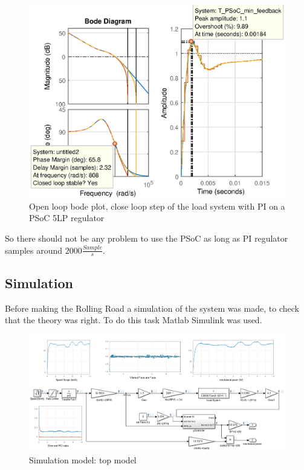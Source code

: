 \begin{figure}[H]
	\centering
	\includegraphics [width=6in]{Hardware/Pictures/RolingRoad_PI_PSOC_result.eps}
	\caption{Open loop bode plot, close loop step of the load system with PI on a PSoC 5LP regulator}
	\label{fig:Open_loop_bode_close_loop_step_load_system_PSOC}
\end{figure}

So there should not be any problem to use the PSoC as long as PI regulator samples around $ 2000  \frac{Sample}{s} $.

\newpage
\subsection{Simulation}

Before making the Rolling Road a simulation of the system was made, to check that the theory was right. To do this task Matlab Simulink was used.

\begin{figure}[H]
	\centering
	\includegraphics [width=6in]{Hardware/Pictures/simulation_top.PNG}
	\caption{Simulation model: top model}
	\label{fig:sim_top}
\end{figure}

